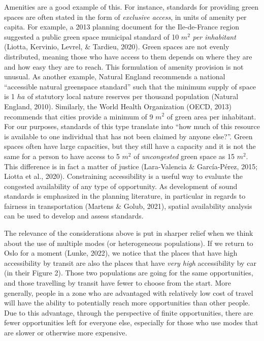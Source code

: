 \documentclass[
11pt, %
oneside, %
english, %
singlespacing, %
]{macthesis} %
\begin{document}
Amenities are a good example of this. For instance, standards for providing green spaces are often stated in the form of \emph{exclusive access}, in units of amenity per capita. For example, a 2013 planning document for the Ile-de-France region suggested a public green space municipal standard of 10 \(m^2\) \emph{per inhabitant} (Liotta, Kervinio, Levrel, \& Tardieu, 2020). Green spaces are not evenly distributed, meaning those who have access to them depends on where they are and how easy they are to reach. This formulation of amenity provision is not unusual. As another example, Natural England recommends a national ``accessible natural greenspace standard'' such that the minimum supply of space is 1 \(ha\) of statutory local nature reserves per thousand population (Natural England, 2010). Similarly, the World Health Organization (OECD, 2013) recommends that cities provide a minimum of 9 \(m^2\) of green area per inhabitant. For our purposes, standards of this type translate into ``how much of this resource is available to one individual that has not been claimed by anyone else?''. Green spaces often have large capacities, but they still have a capacity and it is not the same for a person to have access to 5 \(m^2\) of \emph{uncongested} green space as 15 \(m^2\). This difference is in fact a matter of justice (Lara-Valencia \& García-Pérez, 2015; Liotta et al., 2020). Constraining accessibility is a useful way to evaluate the congested availability of any type of opportunity. As development of sound standards is emphasized in the planning literature, in particular in regards to fairness in transportation (Martens \& Golub, 2021), spatial availability analysis can be used to develop and assess standards.

The relevance of the considerations above is put in sharper relief when we think about the use of multiple modes (or heterogeneous populations). If we return to Oslo for a moment (Lunke, 2022), we notice that the places that have high accessibility by transit are also the places that have \emph{very high} accessibility by car (in their Figure 2). Those two populations are going for the same opportunities, and those travelling by transit have fewer to choose from the start. More generally, people in a zone who are advantaged with relatively low cost of travel will have the ability to potentially reach more opportunities than other people. Due to this advantage, through the perspective of finite opportunities, there are fewer opportunities left for everyone else, especially for those who use modes that are slower or otherwise more expensive.
\end{document}
